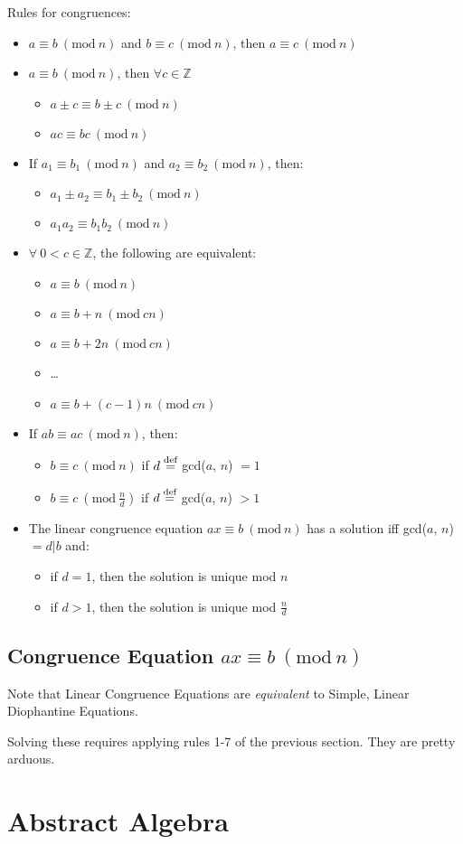 \documentclass{article}
\newcommand{\congr}[3]{
  #1 \equiv #2\ (\textrm{mod}\ #3)
}
\begin{document}
  Rules for congruences:
  \begin{itemize}
    \item $\congr{a}{b}{n}$ and $\congr{b}{c}{n}$, then $\congr{a}{c}{n}$

    \item
      $\congr{a}{b}{n}$, then $\forall c \in \mathbb{Z}$
      \begin{itemize}
        \item $\congr{a \pm c}{b \pm c}{n}$
        \item $\congr{a c}{b c}{n}$
      \end{itemize}

    \item
      If $\congr{a_1}{b_1}{n}$ and $\congr{a_2}{b_2}{n}$, then:
      \begin{itemize}
        \item $\congr{a_1 \pm a_2}{b_1 \pm b_2}{n}$
        \item $\congr{a_1 a_2}{b_1 b_2}{n}$
      \end{itemize}

    \item
      $\forall\ 0 < c \in \mathbb{Z}$, the following are equivalent:
      \begin{itemize}
        \item $\congr{a}{b}{n}$
        \item $\congr{a}{b + n}{cn}$
        \item $\congr{a}{b + 2n}{cn}$
        \item \dots
        \item $\congr{a}{b + (c-1)n}{cn}$
      \end{itemize}

    \item
      If $\congr{ab}{ac}{n}$, then:
      \begin{itemize}
        \item $\congr{b}{c}{n}$ if $d\stackrel{\text{def}}{=}$ gcd($a$, $n$) $= 1$
        \item $\congr{b}{c}{\frac{n}{d}}$ if $d\stackrel{\text{def}}{=}$ gcd($a$, $n$) $> 1$
      \end{itemize}

    \item
      The linear congruence equation $\congr{ax}{b}{n}$ has a solution iff gcd($a$, $n$) $ = d | b$ and:
      \begin{itemize}
        \item if $d=1$, then the solution is unique mod $n$
        \item if $d>1$, then the solution is unique mod $\frac{n}{d}$
      \end{itemize}
  \end{itemize}

  \subsection{Congruence Equation $\congr{ax}{b}{n}$}

  Note that Linear Congruence Equations are \emph{equivalent} to
  Simple, Linear Diophantine Equations.

  Solving these requires applying rules 1-7 of the previous section. They are pretty arduous.

  \section{Abstract Algebra}
\end{document}
